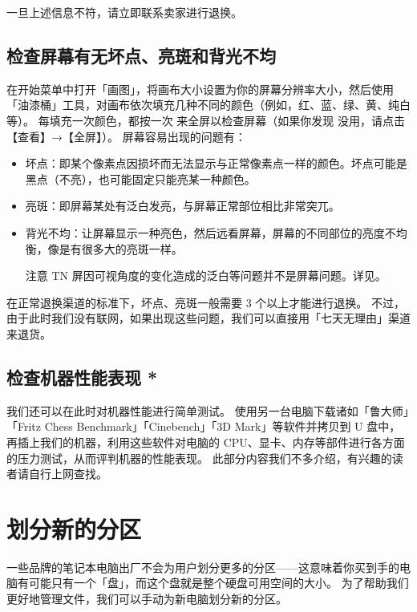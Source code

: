 一旦上述信息不符，请立即联系卖家进行退换。

\subsection{检查屏幕有无坏点、亮斑和背光不均}

在开始菜单中打开「画图」，将画布大小设置为你的屏幕分辨率大小，然后使用「油漆桶」工具，对画布依次填充几种不同的颜色（例如，红、蓝、绿、黄、纯白等）。
每填充一次颜色，都按一次  来全屏以检查屏幕（如果你发现  没用，请点击【查看】→【全屏】）。
屏幕容易出现的问题有：

\begin{itemize}
  \item 坏点：即某个像素点因损坏而无法显示与正常像素点一样的颜色。坏点可能是黑点（不亮），也可能固定只能亮某一种颜色。
  \item 亮斑：即屏幕某处有泛白发亮，与屏幕正常部位相比非常突兀。
  \item 背光不均：让屏幕显示一种亮色，然后远看屏幕，屏幕的不同部位的亮度不均衡，像是有很多大的亮斑一样。
  \begin{note}
    注意 TN 屏因可视角度的变化造成的泛白等问题并不是屏幕问题。详见。
  \end{note}
\end{itemize}

在正常退换渠道的标准下，坏点、亮斑一般需要 3 个以上才能进行退换。
不过，由于此时我们没有联网，如果出现这些问题，我们可以直接用「七天无理由」渠道来退货。

\subsection{检查机器性能表现 *}

我们还可以在此时对机器性能进行简单测试。
使用另一台电脑下载诸如「鲁大师」「Fritz Chess Benchmark」「Cinebench」「3D Mark」等软件并拷贝到 U 盘中，再插上我们的机器，利用这些软件对电脑的 CPU、显卡、内存等部件进行各方面的压力测试，从而评判机器的性能表现。
此部分内容我们不多介绍，有兴趣的读者请自行上网查找。

\section{划分新的分区}

一些品牌的笔记本电脑出厂不会为用户划分更多的分区——这意味着你买到手的电脑有可能只有一个「盘」，而这个盘就是整个硬盘可用空间的大小。
为了帮助我们更好地管理文件，我们可以手动为新电脑划分新的分区。

